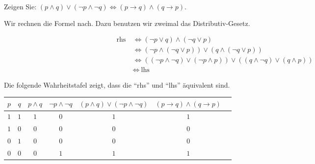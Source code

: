 
\begin{exercise}[19]

Zeigen Sie:
$(p \land q) \lor (\neg p \land \neg q) \Leftrightarrow (p \to q) \land (q \to p)$.

\end{exercise}


\begin{solution}

Wir rechnen die Formel nach.
Dazu benutzen wir zweimal das Distributiv-Gesetz.

\begin{align*}
    \text{rhs}~
    & \iff
    (\neg p \lor q) \land (\neg q \lor p) \\
    & \iff
    (\neg p \land (\neg q \lor p)) \lor (q \land (\neg q \lor p)) \\
    & \iff
    ((\neg p \land \neg q) \lor (\neg p \land p)) \lor ((q \land \neg q) \lor (q \land p)) \\
    & \iff
    ~\text{lhs}
\end{align*}

\end{solution}


\begin{solution}

Die folgende Wahrheitstafel zeigt, dass die \enquote{rhs} und \enquote{lhs} äquivalent sind. \\

\begin{tabular}{|c|c|c|c|c|c|c|}
    \hline
    $p$ & $q$ & $p \land q$ & $\neg p \land \neg q$ & $(p \land q) \lor (\neg p \land \neg q)$ & $(p \to q) \land (q \to p)$ \\
    \hline
    $1$ & $1$ & $1$ & $0$ & $1$ & $1$ \\
    \hline
    $1$ & $0$ & $0$ & $0$ & $0$ & $0$ \\
    \hline
    $0$ & $1$ & $0$ & $0$ & $0$ & $0$ \\
    \hline
    $0$ & $0$ & $0$ & $1$ & $1$ & $1$ \\
    \hline
\end{tabular}

\end{solution}

